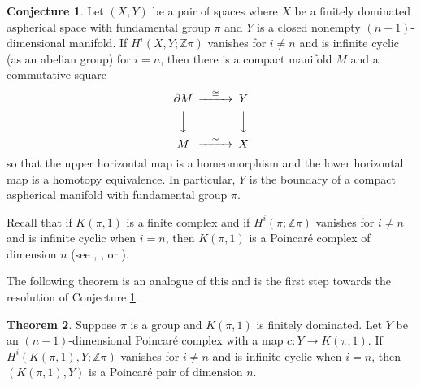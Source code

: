 \documentclass[12pt]{amsart}
\theoremstyle{definition}
\newtheorem{maintheorem}{Theorem}
\newtheorem{conjecture}[maintheorem]{Conjecture}
\newcommand{\Z}{\mathbb Z}
\begin{document}
%

\begin{conjecture} \label{EC}
Let $(X,Y)$ be a pair of spaces where $X$ be a finitely dominated aspherical space with fundamental group $\pi$ and $Y$   is a closed nonempty $(n-1)$-dimensional manifold. If $H^i(X,Y;\Z\pi)$ vanishes for $i \not = n$ and is infinite cyclic (as an abelian group) for $i = n$, then there is a compact manifold $M$ and a commutative square
$$
\begin{CD}
\partial M @>\cong>> Y\\
@VVV @VVV \\
M @>\sim>> X
\end{CD}
$$
so that the upper horizontal map is a homeomorphism and the lower horizontal map is a homotopy equivalence.   In particular, $Y$ is the boundary of a compact aspherical manifold with fundamental group $\pi$.

\end{conjecture}









Recall that if $K(\pi,1)$ is a finite complex and if $H^i(\pi; \Z\pi)$ vanishes for $i \not = n$ and is infinite cyclic when $i = n$, then $K(\pi,1)$ is a Poincar\'e complex of dimension $n$ (see \cite{JW}, \cite{Bieri}, or \cite{Brown}).  

The following theorem is an analogue of this and is the first step towards the resolution of Conjecture \ref{EC}.

\begin{maintheorem} \label{PP}
Suppose $\pi$ is a group and $K(\pi,1)$ is finitely dominated.   Let $Y$ be an $(n-1)$-dimensional Poincar\'e complex with a map $c : Y \to K(\pi,1)$.     If $H^i(K(\pi,1),Y; \Z\pi)$ vanishes for $i \not = n$ and is infinite cyclic when $i = n$, then $(K(\pi,1), Y)$ is a Poincar\'e pair of dimension $n$.  
 \end{maintheorem}
 
\end{document}

